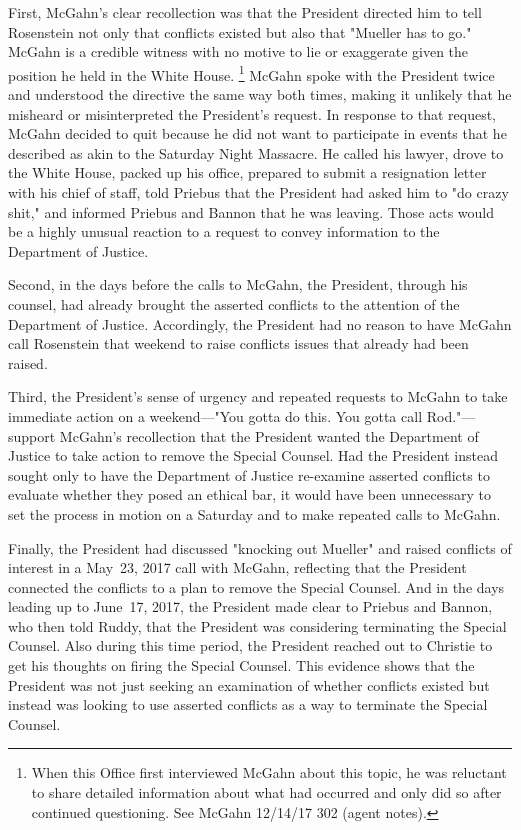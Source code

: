 First, McGahn's clear recollection was that the President directed him to tell Rosenstein not only that conflicts existed but also that "Mueller has to go."
McGahn is a credible witness with no motive to lie or exaggerate given the position he held in the White House.%
\footnote{When this Office first interviewed McGahn about this topic, he was reluctant to share detailed information about what had occurred and only did so after continued questioning.
See McGahn 12/14/17 302 (agent notes).}
McGahn spoke with the President twice and understood the directive the same way both times, making it unlikely that he misheard or misinterpreted the President's request.
In response to that request, McGahn decided to quit because he did not want to participate in events that he described as akin to the Saturday Night Massacre.
He called his lawyer, drove to the White House, packed up his office, prepared to submit a resignation letter with his chief of staff, told Priebus that the President had asked him to "do crazy shit," and informed Priebus and Bannon that he was leaving.
Those acts would be a highly unusual reaction to a request to convey information to the Department of Justice.

Second, in the days before the calls to McGahn, the President, through his counsel, had already brought the asserted conflicts to the attention of the Department of Justice.
Accordingly, the President had no reason to have McGahn call Rosenstein that weekend to raise conflicts issues that already had been raised.

Third, the President's sense of urgency and repeated requests to McGahn to take immediate action on a weekend---"You gotta do this.  You gotta call Rod."---support McGahn's recollection that the President wanted the Department of Justice to take action to remove the Special Counsel.
Had the President instead sought only to have the Department of Justice re-examine asserted conflicts to evaluate whether they posed an ethical bar, it would have been unnecessary to set the process in motion on a Saturday and to make repeated calls to McGahn.

Finally, the President had discussed "knocking out Mueller" and raised conflicts of interest in a May~23, 2017 call with McGahn, reflecting that the President connected the conflicts to a plan to remove the Special Counsel.
And in the days leading up to June~17, 2017, the President made clear to Priebus and Bannon, who then told Ruddy, that the President was considering terminating the Special Counsel.
Also during this time period, the President reached out to Christie to get his thoughts on firing the Special Counsel.
This evidence shows that the President was not just seeking an examination of whether conflicts existed but instead was looking to use asserted conflicts as a way to terminate the Special Counsel.

